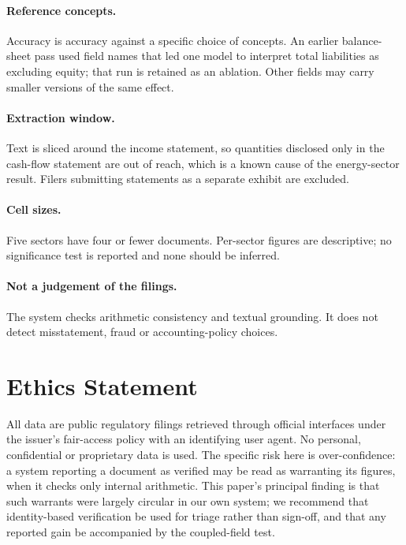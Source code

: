 \documentclass[11pt]{article}
\begin{document}
\paragraph{Reference concepts.} Accuracy is accuracy against a specific choice of
concepts. An earlier balance-sheet pass used field names that led one model to
interpret total liabilities as excluding equity; that run is retained as an ablation.
Other fields may carry smaller versions of the same effect.

\paragraph{Extraction window.} Text is sliced around the income statement, so
quantities disclosed only in the cash-flow statement are out of reach, which is a known
cause of the energy-sector result. Filers submitting statements as a separate exhibit
are excluded.

\paragraph{Cell sizes.} Five sectors have four or fewer documents. Per-sector figures
are descriptive; no significance test is reported and none should be inferred.

\paragraph{Not a judgement of the filings.} The system checks arithmetic consistency
and textual grounding. It does not detect misstatement, fraud or accounting-policy
choices.

\section*{Ethics Statement}

All data are public regulatory filings retrieved through official interfaces under the
issuer's fair-access policy with an identifying user agent. No personal, confidential
or proprietary data is used. The specific risk here is over-confidence: a system
reporting a document as verified may be read as warranting its figures, when it checks
only internal arithmetic. This paper's principal finding is that such warrants were
largely circular in our own system; we recommend that identity-based verification be
used for triage rather than sign-off, and that any reported gain be accompanied by the
coupled-field test.
\end{document}
